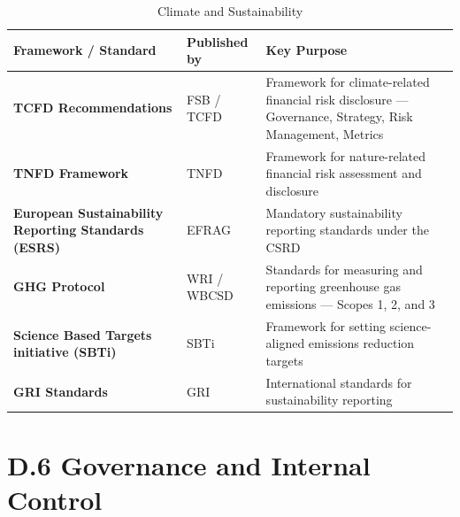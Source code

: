 \begin{table}[H]
  \centering
  \renewcommand{\arraystretch}{1.5}
  \begin{tabularx}{\textwidth}{ | >{\raggedright\arraybackslash}p{} 
								| >{\raggedright\arraybackslash}p{} 
                                | >{\raggedright\arraybackslash}X | }
    \hline
    \textbf{Framework / Standard} & \textbf{Published by} & \textbf{Key Purpose} \\
    \hline
    \textbf{TCFD Recommendations} & FSB / TCFD & Framework for climate-related financial risk disclosure — Governance, Strategy, Risk Management, Metrics\\
    \hline
    \textbf{TNFD Framework} & TNFD & Framework for nature-related financial risk assessment and disclosure\\
    \hline
    \textbf{European Sustainability Reporting Standards (ESRS)} & EFRAG & Mandatory sustainability reporting standards under the CSRD\\
    \hline
    \textbf{GHG Protocol} & WRI / WBCSD & Standards for measuring and reporting greenhouse gas emissions — Scopes 1, 2, and 3\\
    \hline
    \textbf{Science Based Targets initiative (SBTi)} & SBTi & Framework for setting science-aligned emissions reduction targets\\
    \hline
    \textbf{GRI Standards} & GRI & International standards for sustainability reporting\\
    \hline
  \end{tabularx}
  \caption{Climate and Sustainability}
\end{table}

\section*{D.6 Governance and Internal Control}

